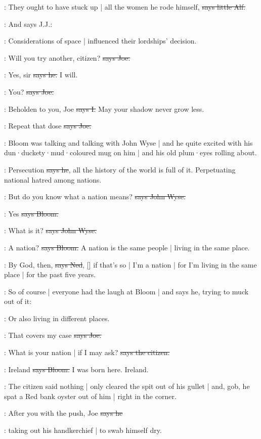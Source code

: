 \bergan:
They ought to have stuck up |
all the women he rode himself,
\sout{says little Alf.}

\Nq:
And says J.J.:

\jjom:
Considerations of space |
influenced their lordships' decision.

\joe:
Will you try another,
citizen?
\sout{says Joe.}

\citizen:
Yes,
sir
\sout{says he.}
I will.

\joe:
You?
\sout{says Joe.}

:
Beholden to you,
Joe
\sout{says I.}
May your shadow never grow less.

\joe:
Repeat that dose
\sout{says Joe.}

\Nq:
Bloom was talking and talking with John Wyse |
and he quite excited with his dun·duckety·mud·coloured mug on him |
and his old plum·eyes rolling about.

\Bloom:
Persecution
\sout{says he},
all the history of the world is full of it.
Perpetuating national hatred among nations.

\johnwyse:
But do you know what a nation means?
\sout{says John Wyse.}

\Bloom:
Yes
\sout{says Bloom.}

\johnwyse:
What is it?
\sout{says John Wyse.}

\Bloom:
A nation?
\sout{says Bloom.}
A nation is the same people |
living in the same place.

\lambert:
By God,
then,
\sout{says Ned},
[]
if that's so |
I'm a nation |
for I'm living in the same place |
for the past five years.

\Nq:
So of course |
everyone had the laugh at Bloom |
and says he,
trying to muck out of it:

\Bloom:
Or also living in different places.

\joe:
That covers my case
\sout{says Joe.}

\citizen:
What is your nation |
if I may ask?
\sout{says the citizen.}

\Bloom:
Ireland
\sout{says Bloom.}
I was born here.
Ireland.

\Nq:
The citizen said nothing |
only cleared the spit out of his gullet |
and,
gob,
he spat a Red bank oyster out of him |
right in the corner.

\citizen:
After you with the push,
Joe
\sout{says he}

\Nq:
taking out his handkerchief |
to swab himself dry.

